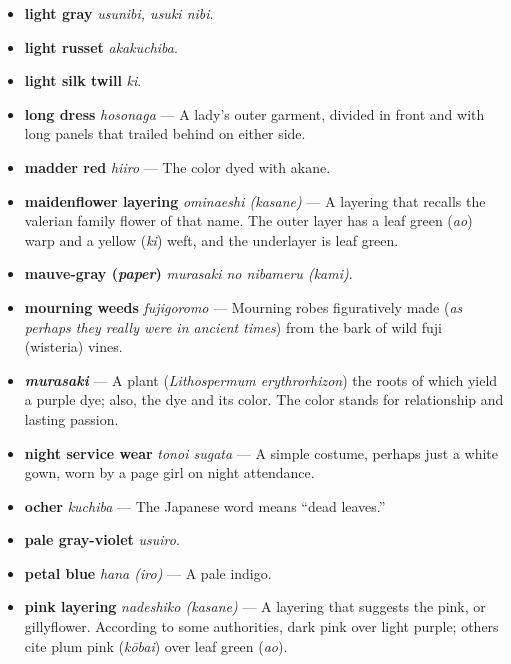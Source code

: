 \documentclass{article}
\begin{document}
\begin{multicols*}{2}
\begin{itemize}[
			label=,
			leftmargin=0em,
			rightmargin=-1.5em,
			itemindent=-2em,
			nosep,
		]
		\item \textbf{light gray} \textit{usunibi, usuki nibi}.

		\item \textbf{light russet} \textit{akakuchiba}.

		\item \textbf{light silk twill} \textit{ki}.

		\item \textbf{long dress} \textit{hosonaga} --- A lady's outer garment, divided in front and with long panels that trailed behind on either side.

		\item \textbf{madder red} \textit{hiiro} --- The color dyed with akane.

		\item \textbf{maidenflower layering} \textit{ominaeshi (\textit{kasane})} --- A layering that recalls the valerian family flower of that name. The outer layer has a leaf green (\textit{ao}) warp and a yellow (\textit{ki}) weft, and the underlayer is leaf green.

		\item \textbf{mauve-gray (\textit{paper})} \textit{murasaki no nibameru (\textit{kami})}.

		\item \textbf{mourning weeds} \textit{fujigoromo} --- Mourning robes figuratively made (\textit{as perhaps they really were in ancient times}) from the bark of wild fuji (wisteria) vines.

		\item \textbf{\textit{murasaki}} --- A plant (\textit{Lithospermum erythrorhizon}) the roots of which yield a purple dye; also, the dye and its color. The color stands for relationship and lasting passion.

		\item \textbf{night service wear} \textit{tonoi sugata} --- A simple costume, perhaps just a white gown, worn by a page girl on night attendance.

		\item \textbf{ocher} \textit{kuchiba} --- The Japanese word means “dead leaves.”

		\item \textbf{pale gray-violet} \textit{usuiro}.

		\item \textbf{petal blue} \textit{hana (\textit{iro})} --- A pale indigo.

		\item \textbf{pink layering} \textit{nadeshiko (\textit{kasane})} --- A layering that suggests the pink, or gillyflower. According to some authorities, dark pink over light purple; others cite plum pink (\textit{kōbai}) over leaf green (\textit{ao}).


\end{itemize}
\end{multicols*}
\end{document}
